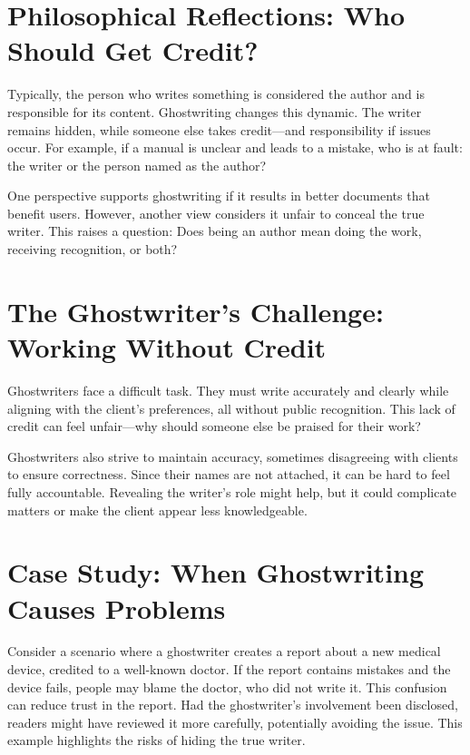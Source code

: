 \documentclass[a4paper,10pt,twocolumn]{memoir}
\begin{document}
\section*{Philosophical Reflections: Who Should Get Credit?}
Typically, the person who writes something is considered the author and is responsible for its content. Ghostwriting changes this dynamic. The writer remains hidden, while someone else takes credit—and responsibility if issues occur. For example, if a manual is unclear and leads to a mistake, who is at fault: the writer or the person named as the author?

One perspective supports ghostwriting if it results in better documents that benefit users. However, another view considers it unfair to conceal the true writer. This raises a question: Does being an author mean doing the work, receiving recognition, or both?


\section*{The Ghostwriter’s Challenge: Working Without Credit}
Ghostwriters face a difficult task. They must write accurately and clearly while aligning with the client’s preferences, all without public recognition. This lack of credit can feel unfair—why should someone else be praised for their work?

Ghostwriters also strive to maintain accuracy, sometimes disagreeing with clients to ensure correctness. Since their names are not attached, it can be hard to feel fully accountable. Revealing the writer’s role might help, but it could complicate matters or make the client appear less knowledgeable.

\section*{Case Study: When Ghostwriting Causes Problems}
Consider a scenario where a ghostwriter creates a report about a new medical device, credited to a well-known doctor. If the report contains mistakes and the device fails, people may blame the doctor, who did not write it. This confusion can reduce trust in the report. Had the ghostwriter’s involvement been disclosed, readers might have reviewed it more carefully, potentially avoiding the issue. This example highlights the risks of hiding the true writer.
\end{document}
